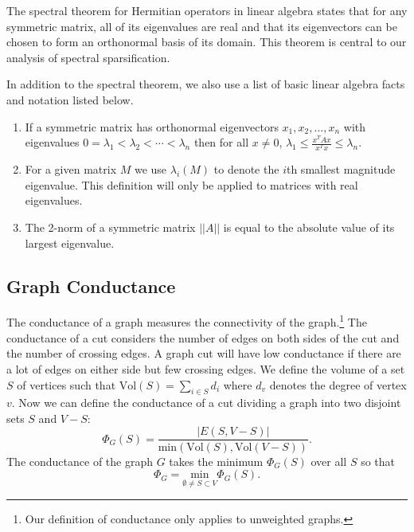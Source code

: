 \documentclass[12pt,twoside]{article}
\begin{document}
The spectral theorem for Hermitian operators in linear algebra states that for any symmetric matrix, all of its eigenvalues are real and that its eigenvectors can be chosen to form an orthonormal basis of its domain. This theorem is central to our analysis of spectral sparsification.

In addition to the spectral theorem, we also use a list of basic linear algebra facts and notation listed below.

\begin{enumerate}
    \item If a symmetric matrix has orthonormal eigenvectors $x_1, x_2, ... , x_n$ with eigenvalues $0 = \lambda_1 < \lambda_2 < \cdots  < \lambda_n$ then for all $x \neq 0$, $\lambda_1 \leq \frac{x^TAx}{x^Tx} \leq \lambda_n$.
    \item For a given matrix $M$ we use $\lambda_i(M)$ to denote the $i$th smallest magnitude eigenvalue. This definition will only be applied to matrices with real eigenvalues.
    \item The 2-norm of a symmetric matrix $||A||$ is equal to the absolute value of its largest eigenvalue.
\end{enumerate}


\subsection{Graph Conductance}

The conductance of a graph measures the connectivity of the graph.\footnote{Our definition of conductance only applies to unweighted graphs.} The conductance of a cut considers the number of edges on both sides of the cut and the number of crossing edges. A graph cut will have low conductance if there are a lot of edges on either side but few crossing edges. We define the volume of a set $S$ of vertices such that $\text{Vol}(S)=\sum_{i\in S} d_i$  where $d_v$ denotes the degree of vertex $v$. Now we can define the conductance of a cut dividing a graph into two disjoint sets $S$ and $V-S$:
%
\begin{equation}
\label{eqn:conductance-def}
\Phi_G(S) = \frac{|E(S,V-S)|}{\text{min}(\text{Vol}(S),\text{Vol}(V-S))}.
\end{equation}
%
The conductance of the graph $G$ takes the minimum $\Phi_G(S)$ over all $S$ so that 
%
\begin{equation}
\Phi_G = \underset{\emptyset \not= S \subset V}{\text{min}} \Phi_G(S).
\end{equation}
\end{document}
